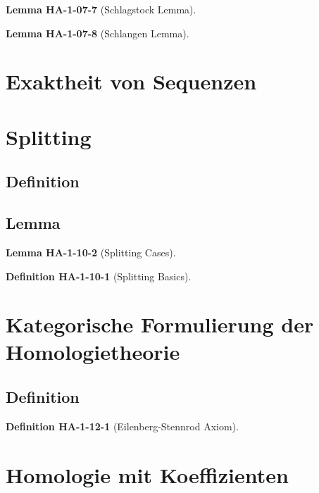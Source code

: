 \documentclass[10pt, letterpaper]{article}
\newcommand{\CustomHeading}[3]{%
  \par\medskip\noindent%
  \textbf{#1 #2} \textnormal{(#3)}.\enskip%
}
\newenvironment{DEF}[2]{\CustomHeading{Definition}{#1}{#2}}{}
\newenvironment{LEM}[2]{\CustomHeading{Lemma}{#1}{#2}}{}
\begin{document}
\begin{LEM}{HA-1-07-7}{Schlagstock Lemma}

\end{LEM}

\begin{LEM}{HA-1-07-8}{Schlangen Lemma}

\end{LEM}




















\section{Exaktheit von Sequenzen}




\section{Splitting}

\subsection{Definition}

\subsection{Lemma}



\begin{LEM}{HA-1-10-2}{Splitting Cases}

\end{LEM}





\begin{DEF}{HA-1-10-1}{Splitting Basics}

\end{DEF}






\section{Kategorische Formulierung der Homologietheorie}

\subsection{Definition}



\begin{DEF}{HA-1-12-1}{Eilenberg-Stennrod Axiom}

\end{DEF}






\section{Homologie mit Koeffizienten}




\pagebreak
\printbibliography
\end{document}
